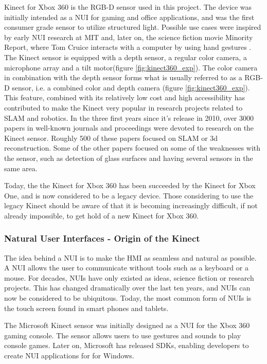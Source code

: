 Kinect for Xbox 360 is the RGB-D sensor used in this project. The device  was initially intended as a \ac{NUI} for gaming and office applications, and was the first consumer grade sensor to utilize structured light. Possible use cases were inspired by early \ac{NUI} research at \ac{MIT} and, later on, the science fiction movie Minority Report, where Tom Cruice interacts with a computer by using hand gestures \cite{kinect_book}. The Kinect sensor is equipped with a depth sensor, a regular color camera, a microphone array and a tilt motor(figure \ref{fig:kinect360_exp}). The color camera in combination with the depth sensor forms what is usually referred to as a RGB-D sensor, i.e. a combined color and depth camera (figure \ref{fig:kinect360_exp}). This feature, combined with its relatively low cost and high accessibility has contributed to make the Kinect very popular in research projects related to \ac{SLAM} and robotics. In the three first years since it's release in 2010, over 3000 papers in well-known journals and proceedings were devoted to research on the Kinect sensor. Roughly 500 of these papers focused on \ac{SLAM} or 3d reconstruction\cite{Berger2013}. Some of the other papers focused on some of the weaknesses with the sensor, such as detection of glass surfaces and having several sensors in the same area. 


Today, the the Kinect for Xbox 360 has been succeeded by the Kinect for Xbox One, and is now considered to be a legacy device. Those considering to use the legacy Kinect should be aware of that it is becoming increasingly difficult, if not already impossible, to get hold of a new Kinect for Xbox 360. 

\subsubsection{Natural User Interfaces - Origin of the Kinect}

The idea behind a \ac{NUI} is to make the \ac{HMI} as seamless and natural as possible. A \ac{NUI} allows the user to communicate without tools such as a keyboard or a mouse. For decades, \ac{NUI}s have only existed as ideas, science fiction or research projects. This has changed dramatically over the last ten years, and \ac{NUI}s can now be considered to be ubiquitous. Today, the most common form of \ac{NUI}s is the touch screen found in smart phones and tablets. 

The Microsoft Kinect sensor was initially designed as a \ac{NUI} for the Xbox 360 gaming console. The sensor allows users to use gestures and sounds to play console games. Later on, Microsoft has released SDKs, enabling developers to create \ac{NUI} applications for for Windows. 

